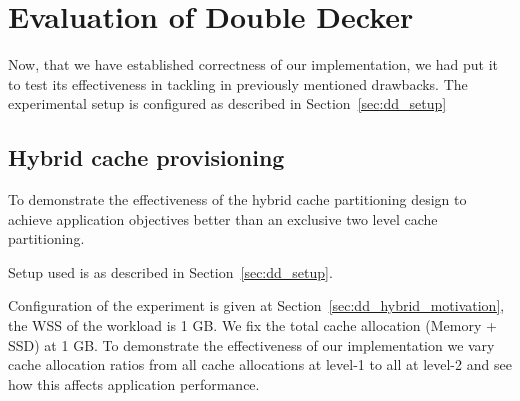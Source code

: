   
  
  \section{Evaluation of Double Decker}
    Now, that we have established correctness of our implementation, we had put it to test its effectiveness in 
    tackling in previously mentioned drawbacks. The experimental setup is configured as described in Section~\ref{sec:dd_setup}
    
  
    \subsection{Hybrid cache provisioning}
    
	To demonstrate the effectiveness of the hybrid cache partitioning design to achieve application objectives
	better than an exclusive two level cache partitioning.
	
	Setup used is as described in Section~\ref{sec:dd_setup}.
	
	Configuration of the experiment is given at Section~\ref{sec:dd_hybrid_motivation}, the WSS of the workload is
	1 GB. We fix the total cache allocation (Memory + SSD) at 1 GB.	To demonstrate the effectiveness of our 
	implementation we vary cache allocation ratios from all cache allocations at level-1 to all at level-2 and 
	see how this affects application performance.
	
